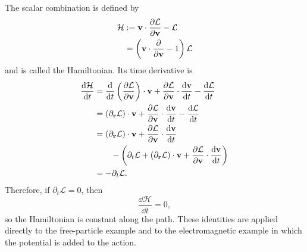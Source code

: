 The scalar combination is defined by
\begin{equation}
\begin{aligned}
\mathcal H
&:=\mathbf{v}\cdot\frac{\partial\mathcal L}{\partial\mathbf{v}}
-\mathcal L\\
&=\left(\mathbf{v}\cdot\frac{\partial}{\partial\mathbf{v}}-1\right)
\mathcal L
\end{aligned}
\label{eq:hamiltonian-definition}
\end{equation}
and is called the Hamiltonian. Its time derivative is
\begin{align*}
\frac{\mathrm d\mathcal H}{\mathrm d t}
&=\frac{\mathrm d}{\mathrm d t}
\left(\frac{\partial\mathcal L}{\partial\mathbf{v}}\right)\cdot\mathbf{v}
+\frac{\partial\mathcal L}{\partial\mathbf{v}}\cdot
\frac{\mathrm d\mathbf{v}}{\mathrm d t}
-\frac{\mathrm d\mathcal L}{\mathrm d t}\notag\\
&=(\partial_{\mathbf{r}}\mathcal L)\cdot\mathbf{v}
+\frac{\partial\mathcal L}{\partial\mathbf{v}}\cdot
\frac{\mathrm d\mathbf{v}}{\mathrm d t}
-\frac{\mathrm d\mathcal L}{\mathrm d t}\notag\\
&=(\partial_{\mathbf{r}}\mathcal L)\cdot\mathbf{v}
+\frac{\partial\mathcal L}{\partial\mathbf{v}}\cdot
\frac{\mathrm d\mathbf{v}}{\mathrm d t}\notag\\
&\qquad-\left(
\partial_t\mathcal L
+(\partial_{\mathbf{r}}\mathcal L)\cdot\mathbf{v}
+\frac{\partial\mathcal L}{\partial\mathbf{v}}\cdot
\frac{\mathrm d\mathbf{v}}{\mathrm d t}
\right)\notag\\
&=-\partial_t\mathcal L.
\end{align*}
Therefore, if \(\partial_t\mathcal L=0\), then
\begin{equation*}
\frac{\dd\mathcal H}{\dd t}=0,
\end{equation*}
so the Hamiltonian is constant along the path. These identities are applied
directly to the free-particle example and to the electromagnetic example in
which the potential is added to the action.

